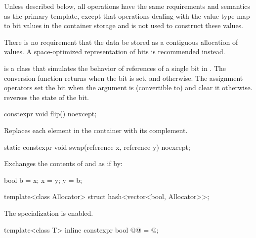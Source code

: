 \pnum
Unless described below, all operations have the same requirements and
semantics as the primary  template, except that operations
dealing with the  value type map to bit values in the
container storage and
is not used to construct these values.

\pnum
There is no requirement that the data be stored as a contiguous allocation
of  values. A space-optimized representation of bits is
recommended instead.

\pnum
{}
is a class that simulates the behavior of references of a single bit in
. The conversion function returns 
when the bit is set, and  otherwise. The assignment operators
set the bit when the argument is (convertible to)  and
clear it otherwise.  reverses the state of the bit.

%
\begin{itemdecl}
constexpr void flip() noexcept;
\end{itemdecl}

\begin{itemdescr}
\pnum
\effects
Replaces each element in the container with its complement.
\end{itemdescr}

%
\begin{itemdecl}
static constexpr void swap(reference x, reference y) noexcept;
\end{itemdecl}

\begin{itemdescr}
\pnum
\effects
Exchanges the contents of  and  as if by:

\begin{codeblock}
bool b = x;
x = y;
y = b;
\end{codeblock}

\end{itemdescr}

\begin{itemdecl}
template<class Allocator> struct hash<vector<bool, Allocator>>;
\end{itemdecl}

\begin{itemdescr}
\pnum
The specialization is enabled.
\end{itemdescr}

%
\begin{itemdecl}
template<class T>
  inline constexpr bool @@ = @\seebelow@;
\end{itemdecl}

